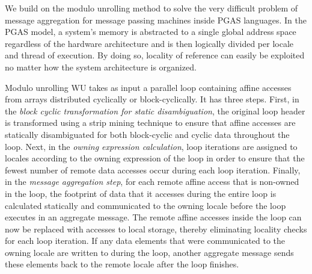 \begin{comment}

It its basic form, it unrolls each affine loop by a factor equal to the number of locales of the machine being utilized by the program. If the arrays used in the loop are distributed cyclically or block-cyclically, each array access is guaranteed to reside on a single locale across all iterations of the loop. Using this information, the compiler can then aggregate all remote array accesses that reside on a remote locale into a single message before the loop. If remote array elements are written to during the loop, a single message is required to store these elements back to each remote locale after the loop runs.
\end{comment} 

We build on the modulo unrolling method to solve the very difficult problem of message aggregation for message passing machines inside PGAS languages. In the PGAS model, a system's memory is abstracted to a single global address space regardless of the hardware architecture and is then logically divided per locale and thread of execution. By doing so, locality of reference can easily be exploited no matter how the system architecture is organized.

Modulo unrolling WU takes as input a parallel loop containing affine accesses from arrays distributed cyclically or block-cyclically. It has three steps. First, in the \textit{block cyclic transformation for static disambiguation}, the original loop header is transformed using a strip mining technique to ensure that affine accesses are statically disambiguated for both block-cyclic and cyclic data throughout the loop. Next, in the \textit{owning expression calculation}, loop iterations are assigned to locales according to the owning expression of the loop in order to ensure that the fewest number of remote data accesses occur during each loop iteration. Finally, in the \textit{message aggregation step}, for each remote affine access that is non-owned in the loop, the footprint of data that it accesses during the entire loop is calculated statically and communicated to the owning locale before the loop executes in an aggregate message. The remote affine accesses inside the loop can now be replaced with accesses to local storage, thereby eliminating locality checks for each loop iteration. If any data elements that were communicated to the owning locale are written to during the loop, another aggregate message sends these elements back to the remote locale after the loop finishes. 

